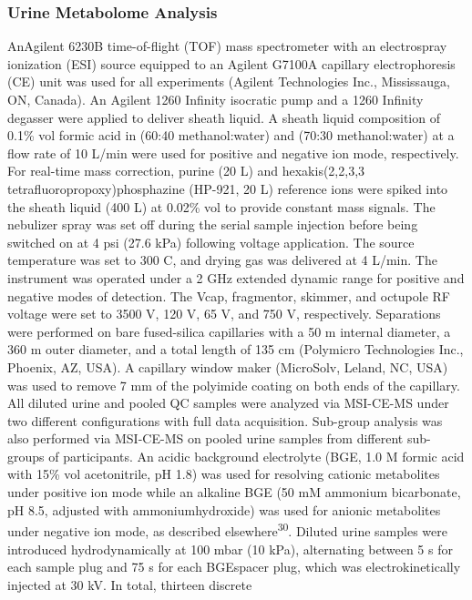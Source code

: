 \documentclass[journal=jacsat,manuscript=article]{achemso}
\begin{document}
\subsubsection{Urine Metabolome
Analysis}\label{urine-metabolome-analysis}

AnAgilent 6230B time-of-flight (TOF) mass spectrometer with an
electrospray ionization (ESI) source equipped to an Agilent G7100A
capillary electrophoresis (CE) unit was used for all experiments
(Agilent Technologies Inc., Mississauga, ON, Canada). An Agilent 1260
Infinity isocratic pump and a 1260 Infinity degasser were applied to
deliver sheath liquid. A sheath liquid composition of 0.1\% vol formic
acid in (60:40 methanol:water) and (70:30 methanol:water) at a flow rate
of 10 L/min were used for positive and negative ion mode, respectively.
For real-time mass correction, purine (20 L) and hexakis(2,2,3,3
tetrafluoropropoxy)phosphazine (HP-921, 20 L) reference ions were spiked
into the sheath liquid (400 L) at 0.02\% vol to provide constant mass
signals. The nebulizer spray was set off during the serial sample
injection before being switched on at 4 psi (27.6 kPa) following voltage
application. The source temperature was set to 300 C, and drying gas was
delivered at 4 L/min. The instrument was operated under a 2 GHz extended
dynamic range for positive and negative modes of detection. The Vcap,
fragmentor, skimmer, and octupole RF voltage were set to 3500 V, 120 V,
65 V, and 750 V, respectively. Separations were performed on bare
fused-silica capillaries with a 50 m internal diameter, a 360 m outer
diameter, and a total length of 135 cm (Polymicro Technologies Inc.,
Phoenix, AZ, USA). A capillary window maker (MicroSolv, Leland, NC, USA)
was used to remove 7 mm of the polyimide coating on both ends of the
capillary. All diluted urine and pooled QC samples were analyzed via
MSI-CE-MS under two different configurations with full data acquisition.
Sub-group analysis was also performed via MSI-CE-MS on pooled urine
samples from different sub-groups of participants. An acidic background
electrolyte (BGE, 1.0 M formic acid with 15\% vol acetonitrile, pH 1.8)
was used for resolving cationic metabolites under positive ion mode
while an alkaline BGE (50 mM ammonium bicarbonate, pH 8.5, adjusted with
ammoniumhydroxide) was used for anionic metabolites under negative ion
mode, as described elsewhere\textsuperscript{30}. Diluted urine samples
were introduced hydrodynamically at 100 mbar (10 kPa), alternating
between 5 s for each sample plug and 75 s for each BGEspacer plug, which
was electrokinetically injected at 30 kV. In total, thirteen discrete
\end{document}
